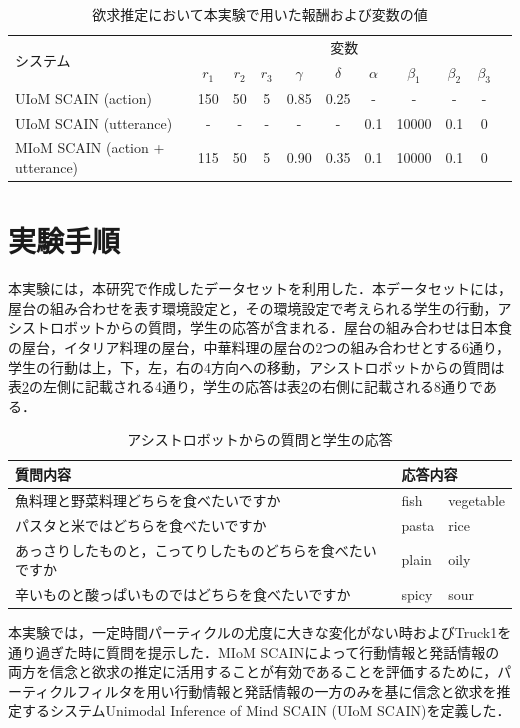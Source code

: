 \begin{table}[htb]
  \begin{center}
  \caption{欲求推定において本実験で用いた報酬および変数の値}
  \label{d_params}
  \begin{tabular}{lcccccccccc} \hline
    \multirow{2}{*}{システム}&\multicolumn{9}{c}{変数}\\\cline{2-10}
    & $r_1$& $r_2$&$r_3$&$\gamma$&$\delta$&$\alpha$&$\beta_1$&$\beta_2$&$\beta_3$\\ \hline
    UIoM SCAIN (action)&150&50&5&0.85&0.25&-&-&-&-\\
    UIoM SCAIN (utterance)&-&-&-&-&-&0.1&10000&0.1&0\\
    MIoM SCAIN (action + utterance)&115&50&5&0.90&0.35&0.1&10000&0.1&0\\\hline
  \end{tabular}
\end{center}
\end{table}

\section{実験手順}

\par
本実験には，本研究で作成したデータセットを利用した．本データセットには，屋台の組み合わせを表す環境設定と，その環境設定で考えられる学生の行動，アシストロボットからの質問，学生の応答が含まれる．屋台の組み合わせは日本食の屋台，イタリア料理の屋台，中華料理の屋台の2つの組み合わせとする6通り，学生の行動は上，下，左，右の4方向への移動，アシストロボットからの質問は表\ref{tab:q_a}の左側に記載される4通り，学生の応答は表\ref{tab:q_a}の右側に記載される8通りである．
\begin{table}[htb]
  \begin{center}
  \caption{アシストロボットからの質問と学生の応答}
  \label{tab:q_a}
  \begin{tabular}{lll} \hline
    質問内容&\multicolumn{2}{l}{応答内容}\\\hline
    魚料理と野菜料理どちらを食べたいですか&fish&vegetable\\
    パスタと米ではどちらを食べたいですか&pasta&rice\\
    あっさりしたものと，こってりしたものどちらを食べたいですか&plain&oily\\
    辛いものと酸っぱいものではどちらを食べたいですか&spicy&sour\\\hline
  \end{tabular}
\end{center}
\end{table}
本実験では，一定時間パーティクルの尤度に大きな変化がない時およびTruck1を通り過ぎた時に質問を提示した．MIoM SCAINによって行動情報と発話情報の両方を信念と欲求の推定に活用することが有効であることを評価するために，パーティクルフィルタを用い行動情報と発話情報の一方のみを基に信念と欲求を推定するシステムUnimodal Inference of Mind SCAIN (UIoM SCAIN)を定義した．


